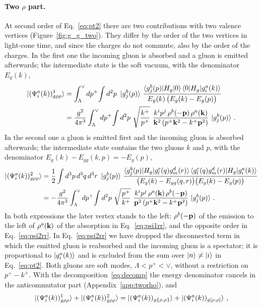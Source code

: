 \paragraph{Two $\rho$ part.} At second order of Eq.~\eqref{eq:pt2} there are two contributions with two valence vertices (Figure~\ref{fig:g_g_two}). They differ by the order of the two vertices in light-cone time, and since the charges do not commute, also by the order of the charges. In the first one the incoming gluon is absorbed and a gluon is emitted afterwards; the intermediate state is the soft vacuum, with the denominator $E_g(k)$,
\begin{align}\label{eq:psi1rr}
\ket{(\Psi^a_i(k))^1_{g\rho\rho}}&=\int_\Lambda^\vee dp^+\!\int d^2p\ \ket{g^b_j(p)}\,\frac{\braket{g^b_j(p)|H_g|0}\braket{0|H_g|g^a_i(k)}}{E_g(k)\,\big(E_g(k)-E_g(p)\big)}\notag\\
&=\frac{g^2}{4\pi^3}\int_\Lambda^\vee dp^+\!\int d^2p\ \sqrt{\frac{k^+}{p^+}}\ \frac{k^ip^j\,\rho^b(-\v p)\,\rho^a(\v k)}{\v k^2\,(p^+\v k^2-k^+\v p^2)}\,\ket{g^b_j(p)}\,.
\end{align}
In the second one a gluon is emitted first and the incoming gluon is absorbed afterwards; the intermediate state contains the two gluons $k$ and $p$, with the denominator $E_g(k)-E_{gg}(k,p)=-E_g(p)$,
\begin{align}\label{eq:psi2rr}
\ket{(\Psi^a_i(k))^2_{g\rho\rho}}&=\frac12\int d^3p\,d^3q\,d^3r\ \ket{g^b_j(p)}\,\frac{\braket{g^b_j(p)|H_g|g^c_l(q)g^d_m(r)}\braket{g^c_l(q)g^d_m(r)|H_g|g^a_i(k)}}{\big(E_g(k)-E_{gg}(q,r)\big)\big(E_g(k)-E_g(p)\big)}\notag\\
&=-\frac{g^2}{4\pi^3}\int_\Lambda^\vee dp^+\!\int d^2p\ \sqrt{\frac{p^+}{k^+}}\ \frac{k^ip^j\,\rho^a(\v k)\,\rho^b(-\v p)}{\v p^2\,(p^+\v k^2-k^+\v p^2)}\,\ket{g^b_j(p)}\,.
\end{align}
In both expressions the later vertex stands to the left: $\rho^b(-\mathbf{p})$ of the emission to the left of $\rho^a(\mathbf{k})$ of the absorption in Eq.~\eqref{eq:psi1rr}, and the opposite order in Eq.~\eqref{eq:psi2rr}. In Eq.~\eqref{eq:psi2rr} we have dropped the disconnected term in which the emitted gluon is reabsorbed and the incoming gluon is a spectator; it is proportional to $\ket{g^a_i(k)}$ and is excluded from the sum over $\ket n\neq\ket i$ in Eq.~\eqref{eq:pt2}. Both gluons are soft modes, $\Lambda<p^+<\vee$, without a restriction on $p^+-k^+$. With the decomposition~\eqref{eq:decomp} the energy denominator cancels in the anticommutator part (Appendix~\ref{app:tworho}), and
\begin{align}\label{eq:rrsum}
\ket{(\Psi^a_i(k))^1_{g\rho\rho}}+\ket{(\Psi^a_i(k))^2_{g\rho\rho}}=\ket{(\Psi^a_i(k))_{g\{\rho,\rho\}}}+\ket{(\Psi^a_i(k))_{g[\rho,\rho]}}\,,
\end{align}
